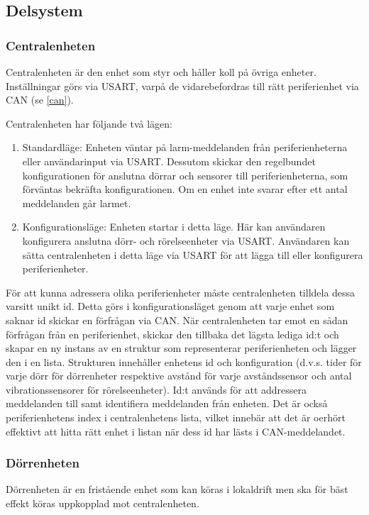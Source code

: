 \documentclass{article}
\begin{document}
\subsection{Delsystem }
\subsubsection{Centralenheten}
Centralenheten är den enhet som styr och håller koll på övriga enheter.
 Inställningar görs via USART, varpå de vidarebefordras till rätt
  periferienhet via CAN (se \ref{can}). 

Centralenheten har följande två lägen:

\begin{enumerate}
    \item Standardläge: Enheten väntar på larm-meddelanden från 
    periferienheterna eller användarinput via USART. Dessutom 
    skickar den regelbundet  konfigurationen för anslutna 
    dörrar och sensorer till periferienheterna, som förväntas 
    bekräfta konfigurationen. Om en enhet inte svarar efter 
    ett antal meddelanden går larmet.
    \item Konfigurationsläge: Enheten startar i detta läge.
     Här kan användaren konfigurera anslutna dörr- och 
     rörelseenheter via USART. Användaren kan sätta centralenheten
      i detta läge via USART för att lägga till eller konfigurera
       periferienheter.
\end{enumerate}

För att kunna adressera olika periferienheter måste centralenheten 
tilldela dessa varsitt unikt id. Detta görs i konfigurationsläget
genom att varje enhet som saknar id skickar en förfrågan via CAN.
När centralenheten tar emot en sådan förfrågan från en periferienhet, 
skickar den tillbaka det lägsta lediga id:t och skapar en ny instans
av en struktur som representerar periferienheten och lägger den i en
lista. Strukturen innehåller enhetens id och konfiguration (d.v.s.
tider för varje dörr för dörrenheter respektive avstånd för varje
avståndssensor och antal vibrationssensorer för rörelseenheter). 
Id:t används för att addressera meddelanden till samt identifiera 
meddelanden från enheten. Det är också periferienhetens index i 
centralenhetens lista, vilket innebär att det är oerhört effektivt
att hitta rätt enhet i listan när dess id har lästs i CAN-meddelandet.





\subsubsection{Dörrenheten}
Dörrenheten är en fristående enhet som kan köras i lokaldrift
men ska för bäst effekt köras uppkopplad mot centralenheten.
\end{document}
